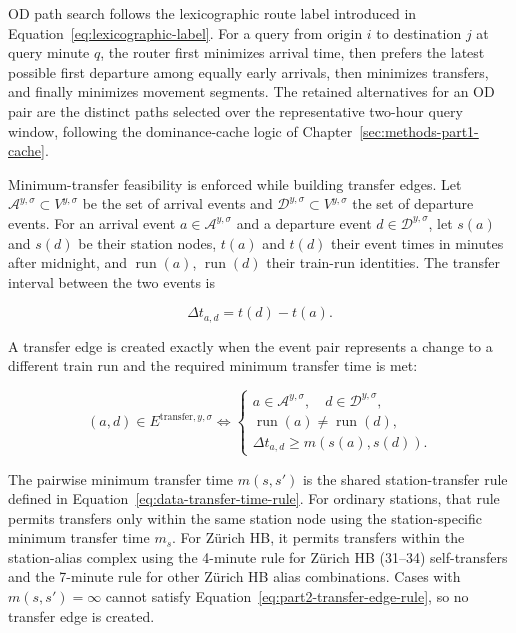 \documentclass[preprint,12pt]{elsarticle}
\begin{document}
OD path search follows the lexicographic route label introduced in Equation~\eqref{eq:lexicographic-label}. For a query from origin \(i\) to destination \(j\) at query minute \(q\), the router first minimizes arrival time, then prefers the latest possible first departure among equally early arrivals, then minimizes transfers, and finally minimizes movement segments. The retained alternatives for an OD pair are the distinct paths selected over the representative two-hour query window, following the dominance-cache logic of Chapter~\ref{sec:methods-part1-cache}.

Minimum-transfer feasibility is enforced while building transfer edges. Let \(\mathcal{A}^{y,\sigma}\subset V^{y,\sigma}\) be the set of arrival events and \(\mathcal{D}^{y,\sigma}\subset V^{y,\sigma}\) the set of departure events. For an arrival event \(a\in\mathcal{A}^{y,\sigma}\) and a departure event \(d\in\mathcal{D}^{y,\sigma}\), let \(s(a)\) and \(s(d)\) be their station nodes, \(t(a)\) and \(t(d)\) their event times in minutes after midnight, and \(\operatorname{run}(a)\), \(\operatorname{run}(d)\) their train-run identities. The transfer interval between the two events is

\begin{equation}
\Delta t_{a,d}=t(d)-t(a).
\label{eq:part2-transfer-wait}
\end{equation}

A transfer edge is created exactly when the event pair represents a change to a different train run and the required minimum transfer time is met:

\begin{equation}
(a,d)\in E^{\mathrm{transfer},y,\sigma}
\Longleftrightarrow
\begin{cases}
a\in\mathcal{A}^{y,\sigma},\quad d\in\mathcal{D}^{y,\sigma},\\
\operatorname{run}(a)\ne\operatorname{run}(d),\\
\Delta t_{a,d}\ge m(s(a),s(d)).
\end{cases}
\label{eq:part2-transfer-edge-rule}
\end{equation}

The pairwise minimum transfer time \(m(s,s')\) is the shared station-transfer rule defined in Equation~\eqref{eq:data-transfer-time-rule}. For ordinary stations, that rule permits transfers only within the same station node using the station-specific minimum transfer time \(m_s\). For Zürich HB, it permits transfers within the station-alias complex using the 4-minute rule for Zürich HB (31--34) self-transfers and the 7-minute rule for other Zürich HB alias combinations. Cases with \(m(s,s')=\infty\) cannot satisfy Equation~\eqref{eq:part2-transfer-edge-rule}, so no transfer edge is created.
\end{document}
